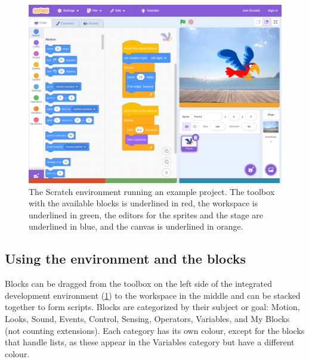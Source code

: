 \documentclass[../main]{subfiles}
\begin{document}
\begin{figure}
    \begin{wide}
        \includegraphics[width=\linewidth]{./scratch-ide}
    \end{wide}
    \caption{The Scratch environment running an example project.
    The toolbox with the available blocks is underlined in \textcolor{ugent-re}{red}, the workspace is underlined in \textcolor{ugent-ps}{green}, the editors for the sprites and the stage are underlined in \textcolor{ugent-we}{blue}, and the canvas is underlined in \textcolor{ugent-lw}{orange}.}
    \label{fig:scratch-environment}
\end{figure}

\subsection{Using the environment and the blocks}\label{subsec:using-the-environment-and-the-blocks}

Blocks can be dragged from the toolbox on the left side of the integrated development environment (\cref{fig:scratch-environment}) to the workspace in the middle and can be stacked together to form scripts.
Blocks are categorized by their subject or goal: \textcolor{scrmove}{Motion}, \textcolor{scrlook}{Looks}, \textcolor{scrsound}{Sound}, \textcolor{screvent}{Events}, \textcolor{scrcontrol}{Control}, \textcolor{scrsensing}{Sensing}, \textcolor{scroperator}{Operators}, \textcolor{scrvariable}{Variables}, and \textcolor{scrmoreblocks}{My Blocks} (not counting extensions).
Each category has its own colour, except for the blocks that handle lists, as these appear in the \textcolor{scrvariable}{Variables} category but have a different colour.
\end{document}
